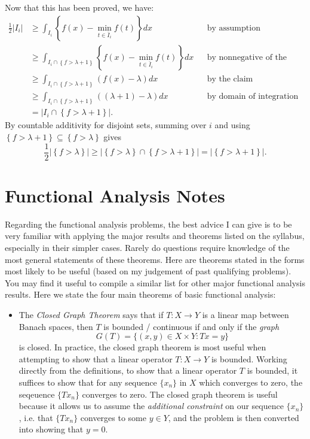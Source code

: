\documentclass{exam}
\theoremstyle{problemstyle}
\newcommand{\1}[1]{\textbf{1}_{\left[#1\right]}} %
\begin{document}
\begin{questions}
\begin{solution}
  Now that this has been proved, we have:
  \begin{align*}
    \frac{1}{2}|I_{i}| &\geq \int_{I_{i}} \left\{ f(x)-\min_{t\in {\bar{I}_{i}}}f(t) \right\} dx
    &&\text{by assumption}\\
                       &\geq\int_{I_{i}\cap \left\{ f > \lambda+1 \right\}} \left\{ f(x)-\min_{t\in{\bar{I}_{i}}}f(t) \right\} dx
    &&\text{by nonnegative of the integrand}\\
                       &\geq \int_{I_{i}\cap \left\{ f > \lambda+1 \right\}} (f(x)-\lambda) dx
    &&\text{by the claim}\\
                       &\geq \int_{I_{i}\cap \left\{ f > \lambda+1 \right\}} ((\lambda+1)-\lambda) dx
    &&\text{by domain of integration}\\
                       &= \left|I_{i} \cap \left\{  f> \lambda+1\right\} \right|.
  \end{align*}
  By countable additivity for disjoint sets, summing over $i$ and using $\left\{f>\lambda+1 \right\}\subseteq
 \left\{f>\lambda \right\}$ gives
  \begin{equation*}
    \frac{1}{2}\left| \left\{f >\lambda \right\} \right|  \geq \left| \left\{ f>\lambda \right\}\cap \left\{ f>\lambda+1 \right\} \right| = \left| \left\{ f>\lambda+1 \right\} \right|.
  \end{equation*}
\end{solution}




\newpage
\section{Functional Analysis Notes}

Regarding the functional analysis problems, the best advice I can give is to be very familiar with applying the major results and theorems listed on the syllabus, especially in their simpler cases. Rarely do questions require knowledge of the most general statements of these theorems. Here are theorems stated in the forms most likely to be useful (based on my judgement of past qualifying problems). You may find it useful to compile a similar list for other major functional analysis results. Here we state the four main theorems of basic functional analysis:
%
\begin{itemize}
	\item The \emph{Closed Graph Theorem} says that if $T: X \to Y$ is a linear map between Banach spaces, then $T$ is bounded / continuous if and only if the \emph{graph}
	\[ G(T) = \{ (x,y) \in X \times Y: Tx = y \} \]
	is closed. In practice, the closed graph theorem is most useful when attempting to show that a linear operator $T: X \to Y$ is bounded. Working directly from the definitions, to show that a linear operator $T$ is bounded, it suffices to show that for any sequence $\{ x_n \}$ in $X$ which converges to zero, the seqeuence $\{ Tx_n \}$ converges to zero. The closed graph theorem is useful because it allows us to assume the \emph{additional constraint} on our sequence $\{ x_n \}$, i.e. that $\{ Tx_n \}$ converges to some $y \in Y$, and the problem is then converted into showing that $y = 0$.


\end{itemize}
\end{questions}
\end{document}
